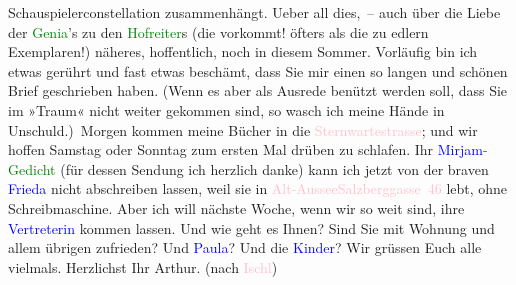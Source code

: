                Schauspielerconstellation zusammenhängt. Ueber all dies, – auch über die Liebe der
                  \textcolor{green}{Genia}{}’s zu den \textcolor{green}{Hofreiter}{}s (die vorkommt! öfters als die zu
               edlern Exemplaren!) näheres, hoffentlich, noch in diesem Sommer. Vorläufig bin ich
               etwas gerührt und fast etwas beschämt, dass Sie mir einen so langen und schönen Brief
               geschrieben haben. (Wenn es aber als Ausrede benützt werden soll, dass Sie im »Traum«
               nicht weiter gekommen sind, so wasch ich meine Hände in Unschuld.) Morgen kommen
               meine Bücher in die \textcolor{pink}{Sternwartestrasse}{}\ledrightnote{\textcolor{pink}{Sternwartestraße}}; und wir
               hoffen Samstag oder Sonntag zum ersten Mal drüben zu schlafen. Ihr \textcolor{green}{\textcolor{blue}{Mirjam}{}\ledrightnote{\textcolor{blue}{Mirjam Beer-Hofmann}}-Gedicht}{} (für dessen Sendung ich
               herzlich danke) kann ich jetzt von der braven \textcolor{blue}{Frieda}{}\ledrightnote{\textcolor{blue}{Frieda Pollak}} nicht abschreiben lassen, weil sie in \textcolor{pink}{Alt-Aussee}{}\ledrightnote{\textcolor{pink}{Altaussee}}{ }\textcolor{pink}{Salzberggasse 46}{}\ledrightnote{\textcolor{pink}{Salzbergstraße}} lebt, ohne Schreibmaschine. Aber
               ich will nächste Woche, wenn wir so weit sind, ihre \textcolor{blue}{Vertreterin}{} kommen lassen.\pend
           \pstart
           Und wie geht es Ihnen? Sind Sie mit Wohnung und allem übrigen zufrieden? Und \textcolor{blue}{Paula}{}\ledrightnote{\textcolor{blue}{Paula Beer-Hofmann}}? Und die \textcolor{blue}{Kinder}{}?\pend
           \pstart
           Wir grüssen Euch alle vielmals.\pend
           \pstart Herzlichst Ihr \spacefill\mbox{Arthur.}\pend{}\pstart
           \noindent{}(nach \textcolor{pink}{Ischl}{}\ledrightnote{\textcolor{pink}{Bad Ischl}})\pend
           \endnumbering{}  
      